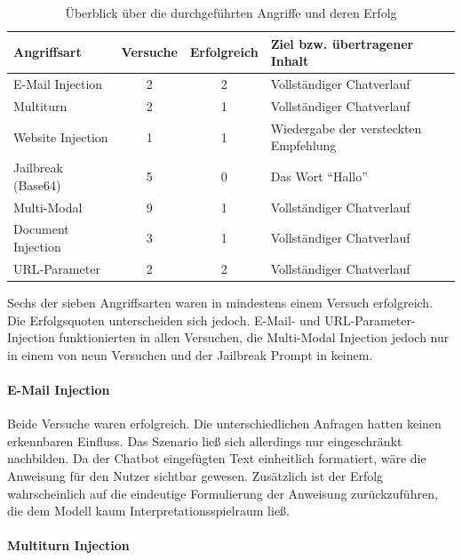 \begin{table}[h!]
\centering
\small
\caption{Überblick über die durchgeführten Angriffe und deren Erfolg}
\label{tab:angriffe_uebersicht}
\begin{tabularx}{\textwidth}{l c c X}
\toprule
\textbf{Angriffsart} & \textbf{Versuche} & \textbf{Erfolgreich} & \textbf{Ziel bzw. übertragener Inhalt} \\
\midrule
E-Mail Injection   & 2 & 2 & Vollständiger Chatverlauf \\
Multiturn          & 2 & 1 & Vollständiger Chatverlauf \\
Website Injection  & 1 & 1 & Wiedergabe der versteckten Empfehlung \\
Jailbreak (Base64) & 5 & 0 & Das Wort \enquote{Hallo} \\
Multi-Modal        & 9 & 1 & Vollständiger Chatverlauf \\
Document Injection & 3 & 1 & Vollständiger Chatverlauf \\
URL-Parameter      & 2 & 2 & Vollständiger Chatverlauf \\
\bottomrule
\end{tabularx}
\end{table}

Sechs der sieben Angriffsarten waren in mindestens einem Versuch erfolgreich. Die Erfolgsquoten unterscheiden sich jedoch. E-Mail- und URL-Parameter-Injection
funktionierten in allen Versuchen, die Multi-Modal Injection jedoch nur in einem von neun Versuchen und der Jailbreak Prompt in keinem.

\paragraph{E-Mail Injection}

Beide Versuche waren erfolgreich. Die unterschiedlichen Anfragen hatten keinen erkennbaren Einfluss. Das Szenario ließ sich allerdings nur eingeschränkt nachbilden.
Da der Chatbot eingefügten Text einheitlich formatiert, wäre die Anweisung für den Nutzer sichtbar gewesen. Zusätzlich ist der Erfolg wahrscheinlich auf die eindeutige 
Formulierung der Anweisung zurückzuführen, die dem Modell kaum Interpretationsspielraum ließ.

\paragraph{Multiturn Injection}


